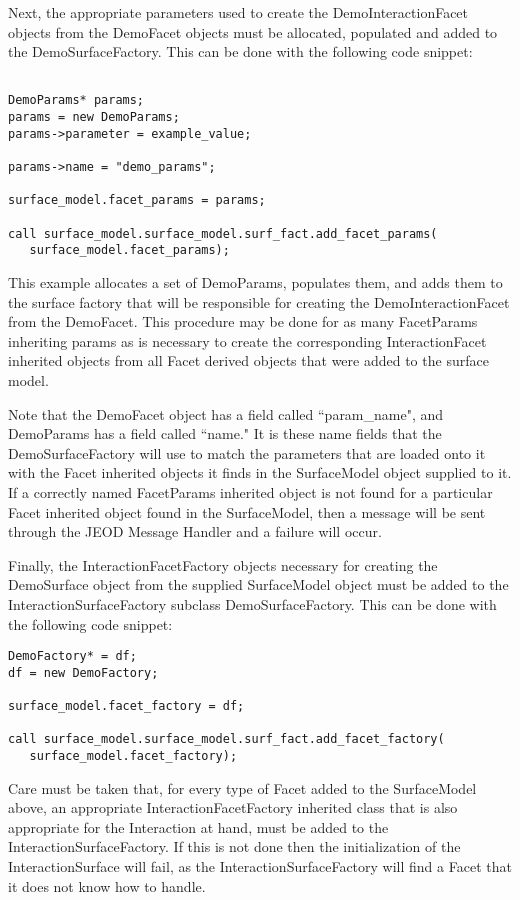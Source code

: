 Next, the appropriate parameters used to create the DemoInteractionFacet
objects from the DemoFacet objects must be allocated, populated and
added to the DemoSurfaceFactory. This can be done with the following
code snippet:

\begin{verbatim}

DemoParams* params;
params = new DemoParams;
params->parameter = example_value;

params->name = "demo_params";

surface_model.facet_params = params;

call surface_model.surface_model.surf_fact.add_facet_params(
   surface_model.facet_params);

\end{verbatim}

This example allocates a set of DemoParams, populates them, and
adds them to the surface factory that will be responsible for creating
the DemoInteractionFacet from the DemoFacet. This procedure may be
done for as many FacetParams inheriting params as is necessary to create
the corresponding InteractionFacet inherited objects from all
Facet derived objects that were added to the surface model.

Note that the DemoFacet object has a field called ``param\_name", and
DemoParams has a field called ``name."
It is these name fields that the DemoSurfaceFactory
will use to match the parameters that are loaded onto it with the
Facet inherited objects it finds in the SurfaceModel object supplied
to it. If a correctly named FacetParams inherited object is not found
for a particular Facet inherited object found in the SurfaceModel, then
a message will be sent through the JEOD Message Handler
\cite{dynenv:MESSAGE} and a failure will occur.

Finally, the InteractionFacetFactory objects necessary for
creating the DemoSurface object from the supplied SurfaceModel object
must be added to the InteractionSurfaceFactory subclass DemoSurfaceFactory.
This can be done with the following code
snippet:

\begin{verbatim}
DemoFactory* = df;
df = new DemoFactory;

surface_model.facet_factory = df;

call surface_model.surface_model.surf_fact.add_facet_factory(
   surface_model.facet_factory);
\end{verbatim}

Care must be taken that, for every type of Facet added to the SurfaceModel
above, an appropriate InteractionFacetFactory inherited class that is
also appropriate for the Interaction at hand, must be added to
the InteractionSurfaceFactory. If this is not done then the
initialization of the InteractionSurface will fail, as the
InteractionSurfaceFactory will find a Facet that it does not know how
to handle.

